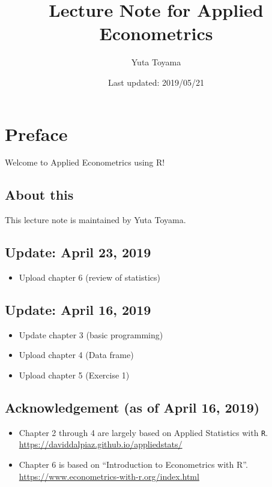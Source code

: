 \documentclass[]{book}
\title{Lecture Note for Applied Econometrics}
\author{Yuta Toyama}
\date{Last updated: 2019/05/21}
\providecommand{\tightlist}{%
  \setlength{\itemsep}{0pt}\setlength{\parskip}{0pt}}
\begin{document}
\maketitle

{
\setcounter{tocdepth}{1}
\tableofcontents
}
\chapter{Preface}\label{preface}

Welcome to Applied Econometrics using R!

\section{About this}\label{about-this}

This lecture note is maintained by Yuta Toyama.

\section{Update: April 23, 2019}\label{update-april-23-2019}

\begin{itemize}
\tightlist
\item
  Upload chapter 6 (review of statistics)
\end{itemize}

\section{Update: April 16, 2019}\label{update-april-16-2019}

\begin{itemize}
\tightlist
\item
  Update chapter 3 (basic programming)
\item
  Upload chapter 4 (Data frame)
\item
  Upload chapter 5 (Exercise 1)
\end{itemize}

\section{Acknowledgement (as of April 16,
2019)}\label{acknowledgement-as-of-april-16-2019}

\begin{itemize}
\tightlist
\item
  Chapter 2 through 4 are largely based on Applied Statistics with
  \texttt{R}. \url{https://daviddalpiaz.github.io/appliedstats/}
\item
  Chapter 6 is based on ``Introduction to Econometrics with R''.
  \url{https://www.econometrics-with-r.org/index.html}
\end{itemize}
\end{document}
